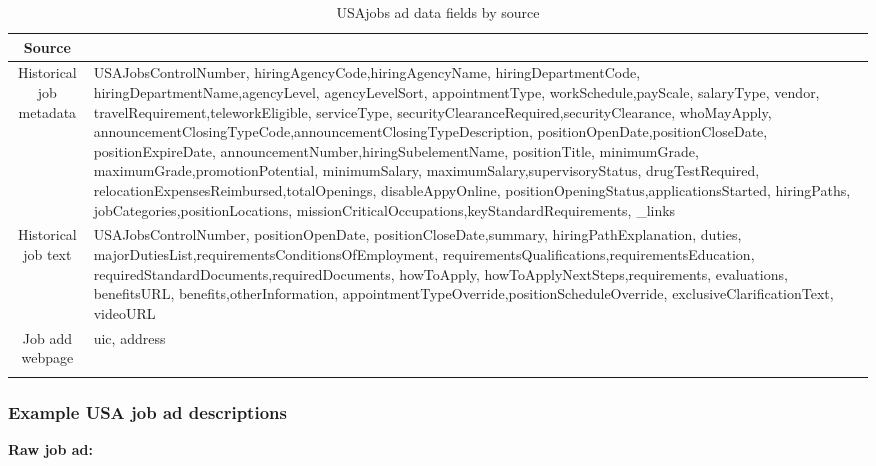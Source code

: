 \documentclass[12pt]{article}
\begin{document}
\begin{table}[ht!]
    \centering
    \vspace*{4mm}
    \begin{tabular}{c | >{\RaggedRight} m{10cm}} 
        \Xhline{3\arrayrulewidth}
            Source & \multicolumn{1}{>{\centering}p{10cm}}{Data fields} \\ \hline\hline
            Historical job metadata &  USAJobsControlNumber, hiringAgencyCode,hiringAgencyName, hiringDepartmentCode, hiringDepartmentName,agencyLevel, agencyLevelSort, appointmentType, workSchedule,payScale, salaryType, vendor, travelRequirement,teleworkEligible, serviceType, securityClearanceRequired,securityClearance, whoMayApply, announcementClosingTypeCode,announcementClosingTypeDescription, positionOpenDate,positionCloseDate, positionExpireDate, announcementNumber,hiringSubelementName, positionTitle, minimumGrade, maximumGrade,promotionPotential, minimumSalary, maximumSalary,supervisoryStatus, drugTestRequired, relocationExpensesReimbursed,totalOpenings, disableAppyOnline, positionOpeningStatus,applicationsStarted, hiringPaths, jobCategories,positionLocations, missionCriticalOccupations,keyStandardRequirements, \_links \\\hline
            Historical job text & USAJobsControlNumber, positionOpenDate, positionCloseDate,summary, hiringPathExplanation, duties, majorDutiesList,requirementsConditionsOfEmployment, requirementsQualifications,requirementsEducation, requiredStandardDocuments,requiredDocuments, howToApply, howToApplyNextSteps,requirements, evaluations, benefitsURL, benefits,otherInformation, appointmentTypeOverride,positionScheduleOverride, exclusiveClarificationText, videoURL \\\hline
            Job add webpage & uic, address \\
        \Xhline{3\arrayrulewidth}
    \end{tabular}
    \caption{USAjobs ad data fields by source}\label{tab:job_fields}
\end{table}
  
\subsubsection{Example USA job ad descriptions}\label{sec:job_ad_example}

\textbf{Raw job ad:}\\
\end{document}
